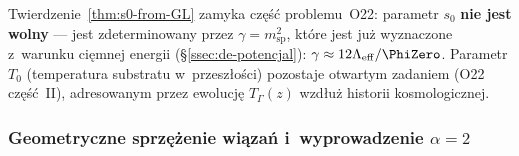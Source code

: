 \begin{remark}%
\label{rem:O22-partial-closure}
Twierdzenie~\ref{thm:s0-from-GL} zamyka cz\k{e}\'s\'c problemu~O22:
parametr $s_0$ \textbf{nie jest wolny} --- jest zdeterminowany
przez $\gamma = m_{\mathrm{sp}}^2$, kt\'ore jest ju\.z
wyznaczone z~warunku ci\k{e}mnej energii
(\S\ref{ssec:de-potencjal}): $\gamma \approx 12\Lambda_{\mathrm{eff}}/\PhiZero$.
Parametr $T_0$ (temperatura substratu w~przesz\l{}o\'sci)
pozostaje otwartym zadaniem (O22 cz\k{e}\'s\'c~II),
adresowanym przez ewolucj\k{e} $T_\Gamma(z)$ wzd\l{}u\.z
historii kosmologicznej.
\end{remark}

\subsubsection{Geometryczne sprz\k{e}\.zenie wi\k{a}za\'n
  i~wyprowadzenie $\alpha = 2$}%
\label{app:B-geo-coupling}

